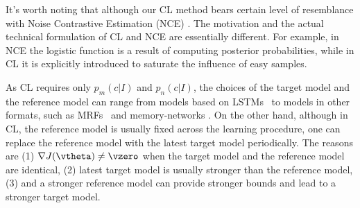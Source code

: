 It's worth noting that
although our CL method bears certain level of resemblance with Noise Contrastive Estimation (NCE) \cite{gutmann2012noise}.
The motivation and the actual technical formulation of CL and NCE are essentially different.
For example,
in NCE the logistic function is a result of computing posterior probabilities,
while in CL it is explicitly introduced to saturate the influence of easy samples.

As CL requires only $p_m(c|I)$ and $p_n(c|I)$,
the choices of the target model and the reference model can
range from models based on LSTMs \cite{hochreiter1997long}~to models in other formats,
such as MRFs \cite{farhadi2010every}~and memory-networks \cite{park2017attend}.
On the other hand, although in CL,
 the reference model is usually fixed across the learning procedure,
one can replace the reference model with the latest target model periodically.
The reasons are
(1) $\nabla J(\vtheta) \ne \vzero$ when the target model and the reference model are identical,
(2) latest target model is usually stronger than the reference model,
(3) and a stronger reference model can provide stronger bounds and lead to a stronger target model.
